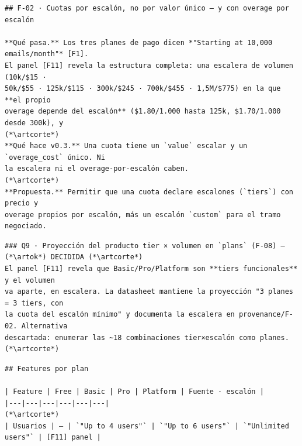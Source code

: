 \begin{mdframed}[style=artefactopm,frametitle={\arttitulo{3}{Registro de elementos no soportados}{fricciones.md}}]
\begin{lstlisting}[style=artefactopm]
## F-02 · Cuotas por escalón, no por valor único — y con overage por escalón

**Qué pasa.** Los tres planes de pago dicen *"Starting at 10,000 emails/month"* [F1].
El panel [F11] revela la estructura completa: una escalera de volumen (10k/$15 ·
50k/$55 · 125k/$115 · 300k/$245 · 700k/$455 · 1,5M/$775) en la que **el propio
overage depende del escalón** ($1.80/1.000 hasta 125k, $1.70/1.000 desde 300k), y
(*\artcorte*)
**Qué hace v0.3.** Una cuota tiene un `value` escalar y un `overage_cost` único. Ni
la escalera ni el overage-por-escalón caben.
(*\artcorte*)
**Propuesta.** Permitir que una cuota declare escalones (`tiers`) con precio y
overage propios por escalón, más un escalón `custom` para el tramo negociado.
\end{lstlisting}
\end{mdframed}
\begin{mdframed}[style=artefactopm,frametitle={\arttitulo{4}{Acta de revisión}{REVISION.md}}]
\begin{lstlisting}[style=artefactopm]
### Q9 · Proyección del producto tier × volumen en `plans` (F-08) — (*\artok*) DECIDIDA (*\artcorte*)
El panel [F11] revela que Basic/Pro/Platform son **tiers funcionales** y el volumen
va aparte, en escalera. La datasheet mantiene la proyección "3 planes = 3 tiers, con
la cuota del escalón mínimo" y documenta la escalera en provenance/F-02. Alternativa
descartada: enumerar las ~18 combinaciones tier×escalón como planes. (*\artcorte*)
\end{lstlisting}
\end{mdframed}
\begin{mdframed}[style=artefactopm,frametitle={\arttitulo{5}{Matriz de \textit{features} por plan}{features.md}}]
\begin{lstlisting}[style=artefactopm]
## Features por plan

| Feature | Free | Basic | Pro | Platform | Fuente · escalón |
|---|---|---|---|---|---|
(*\artcorte*)
| Usuarios | — | `"Up to 4 users"` | `"Up to 6 users"` | `"Unlimited users"` | [F11] panel |
\end{lstlisting}
\end{mdframed}
